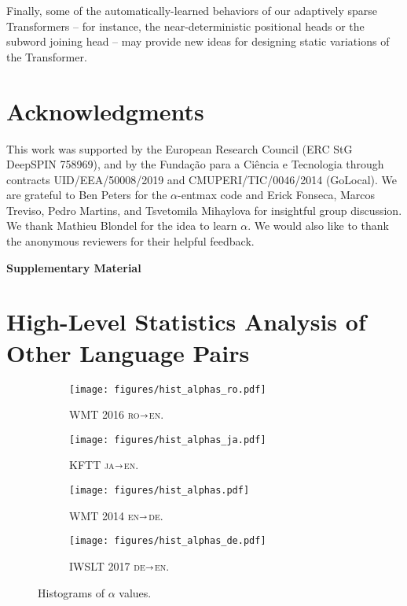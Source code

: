 \documentclass[11pt,a4paper]{article}
\newcommand{\EE}{\mathbb{E}}
\newcommand*\entmaxtext{entmax\xspace}
\newcommand{\langp}[2]{\textsc{#1}$\shortrightarrow$\textsc{#2}}
\begin{document}
Finally, some of the automatically-learned behaviors of our
adaptively sparse Transformers -- for instance, the near-deterministic
positional heads or the subword joining head -- may provide new ideas
for designing static variations of the Transformer.

\section*{Acknowledgments}
This work was supported by the European Research Council (ERC StG
DeepSPIN 758969), and by the Funda\c{c}\~ao para a Ci\^encia e
Tecnologia through contracts UID/EEA/50008/2019 and
CMUPERI/TIC/0046/2014 (GoLocal). We are grateful to Ben Peters for
the $\alpha$-\entmaxtext code and Erick Fonseca, Marcos Treviso,
Pedro Martins, and Tsvetomila Mihaylova for insightful group
discussion. We thank Mathieu Blondel for the idea to learn $\alpha$.
We would also like to thank the anonymous reviewers for their helpful
feedback.




\clearpage
\onecolumn
\appendix
\begin{center}
{\huge \textbf{Supplementary Material}}
\end{center}

\setlength{\parindent}{0pt}
\setlength{\parskip}{1.5ex plus 0.5ex minus .2ex}


\def\RR{{\mathbb{R}}}
\def\EE{{\mathbb{E}}}
\def\RRY{\RR^{|\cY|}}
\def\y{\bm{y}}
\def\triangleY{\triangle^{|\cY|}}
\def\sizeY{{|\cY|}}
\def\cC{{\mathcal{C}}}
\def\cD{{\mathcal{D}}}
\def\cX{{\mathcal{X}}}
\def\cY{{\mathcal{Y}}}

\section{High-Level Statistics Analysis of Other Language Pairs}
\label{sec:plots_lps}

\begin{figure}[h!]
    \centering
    \begin{subfigure}[b]{.47\linewidth}
    \texttt{[image: figures/hist\_alphas\_ro.pdf]}
    \caption{\label{fig:hist_alphas_ro}WMT 2016 \langp{ro}{en}.}
\end{subfigure}
\begin{subfigure}[b]{.47\linewidth}
    \texttt{[image: figures/hist\_alphas\_ja.pdf]}
    \caption{\label{fig:hist_alphas_ja}KFTT \langp{ja}{en}.}
\end{subfigure}

\begin{subfigure}[b]{.47\linewidth}
    \texttt{[image: figures/hist\_alphas.pdf]}
    \caption{\label{fig:hist_alphas_en}WMT 2014 \langp{en}{de}.}
\end{subfigure}
\begin{subfigure}[b]{.47\linewidth}
    \texttt{[image: figures/hist\_alphas\_de.pdf]}
    \caption{\label{fig:hist_alphas_de}IWSLT 2017 \langp{de}{en}.}
\end{subfigure}
\caption{Histograms of $\alpha$ values.}
\label{fig:hist_alphas_lps}
\end{figure}
\end{document}
